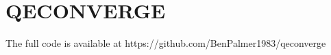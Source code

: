 \chapter{QECONVERGE}
\label{chapter:qeconvergeappendix}
 
The full code is available at https://github.com/BenPalmer1983/qeconverge











 